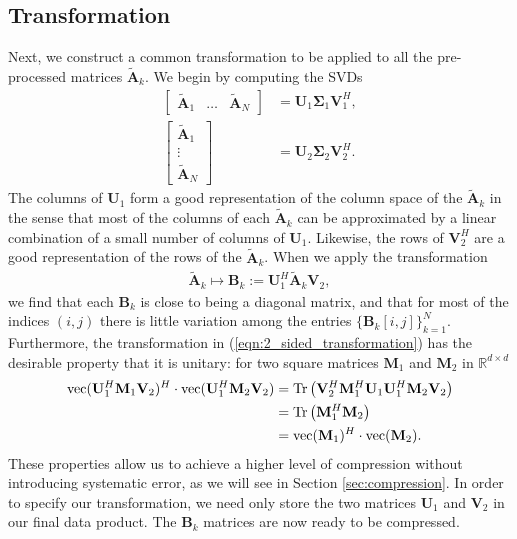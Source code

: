 \documentclass{article}
\newcommand{\Tr}[1]{\text{Tr}\left( #1 \right)}
\begin{document}
\subsection{Transformation} 
\label{sec:transformation} 
Next, we construct a common transformation to be applied to all the pre-processed matrices $\mathbf{\tilde{A}}_k$. We begin by computing the SVDs
\begin{align} 
\begin{bmatrix} \mathbf{\tilde{A}}_1 & \hdots & \mathbf{\tilde{A}}_N \end{bmatrix} & = \mathbf{U}_1 \mathbf{\Sigma}_1 \mathbf{V}_1^H, \label{eqn:svd_long} \\
\begin{bmatrix} \mathbf{\tilde{A}}_1 \\ \vdots \\ \mathbf{\tilde{A}}_N \end{bmatrix} \hspace{20pt} & = \mathbf{U}_2 \mathbf{\Sigma}_2 \mathbf{V}_2^H. \label{eqn:svd_tall}
\end{align} 
The columns of $\mathbf{U}_1$ form a good representation of the column space of the $\mathbf{\tilde{A}}_k$ in the sense that most of the columns of each $\mathbf{\tilde{A}}_k$ can be approximated by a linear combination of a small number of columns of $\mathbf{U}_1$. Likewise, the rows of $\mathbf{V}_2^H$ are a good representation of the rows of the $\mathbf{\tilde{A}}_k$. When we apply the transformation 
\begin{align} 
\mathbf{\tilde{A}}_k \mapsto \mathbf{B}_k := \mathbf{U}_1^H \mathbf{\tilde{A}}_k \mathbf{V}_2, \label{eqn:2_sided_transformation} 
\end{align} 
we find that each $\mathbf{B}_k$ is close to being a diagonal matrix, and that for most of the indices $(i, j)$ there is little variation among the entries $\{\mathbf{B}_k[i, j]\}_{k = 1}^N$.  Furthermore, the transformation in (\ref{eqn:2_sided_transformation}) has the desirable property that it is unitary: for two square matrices $\mathbf{M}_1$ and $\mathbf{M}_2$ in ${\mathbb{R}}^{d \times d}$
\begin{align} 
\nonumber {\rm vec}(\mathbf{U}_1^H \mathbf{M}_1 \mathbf{V}_2)^H \cdot {\rm vec}(\mathbf{U}_1^H \mathbf{M}_2 \mathbf{V}_2) & = \Tr{\mathbf{V}_2^H \mathbf{M}_1^H \mathbf{U}_1 \mathbf{U}_1^H \mathbf{M}_2 \mathbf{V}_2} \\ 
\nonumber & = \Tr{\mathbf{M}_1^H \mathbf{M}_2} \\ 
\nonumber & = {\rm vec}(\mathbf{M}_1)^H \cdot {\rm vec}(\mathbf{M}_2). 
\end{align} 
These properties allow us to achieve a higher level of compression without introducing systematic error, as we will see in Section \ref{sec:compression}. In order to specify our transformation, we need only store the two matrices $\mathbf{U}_1$ and $\mathbf{V}_2$ in our final data product. The $\mathbf{B}_k$ matrices are now ready to be compressed. 
\end{document}
